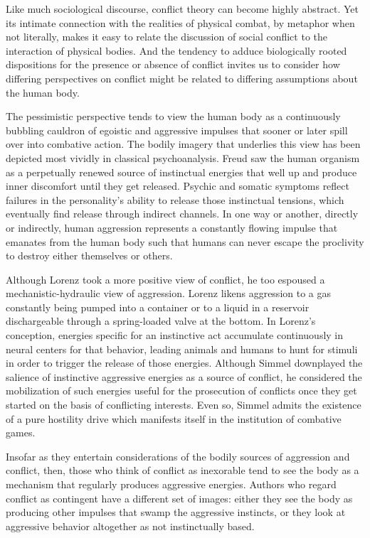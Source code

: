 Like much sociological discourse, conflict theory can become highly abstract. Yet its intimate connection with the realities of physical combat, by metaphor when not literally, makes it easy to relate the discussion of social conflict to the interaction of physical bodies. And the tendency to adduce biologically rooted dispositions for the presence or absence of conflict invites us to consider how differing perspectives on conflict might be related to differing assumptions about the human body.

The pessimistic perspective tends to view the human body as a continuously bubbling cauldron of egoistic and aggressive impulses that sooner or later spill over into combative action. The bodily imagery that underlies this view has been depicted most vividly in classical psychoanalysis. Freud saw the human organism as a perpetually renewed source of instinctual energies that well up and produce inner discomfort until they get released. Psychic and somatic symptoms reflect failures in the personality's ability to release those instinctual tensions, which eventually find release through indirect channels. In one way or another, directly or indirectly, human aggression represents a constantly flowing impulse that emanates from the human body such that humans can never escape the proclivity to destroy either themselves or others. 

Although Lorenz took a more positive view of conflict, he too espoused a mechanistic-hydraulic view of aggression. Lorenz likens aggression to a gas constantly being pumped into a container or to a liquid in a reservoir dischargeable through a spring-loaded valve at the bottom. In Lorenz's conception, energies specific for an instinctive act accumulate continuously in neural centers for that behavior, leading animals and humans to hunt for stimuli in order to trigger the release of those energies. Although Simmel downplayed the salience of instinctive aggressive energies as a source of conflict, he considered the mobilization of such energies useful for the prosecution of conflicts once they get started on the basis of conflicting interests. Even so, Simmel admits the existence of a pure hostility drive which manifests itself in the institution of combative games.

Insofar as they entertain considerations of the bodily sources of aggression and conflict, then, those who think of conflict as inexorable tend to see the body as a mechanism that regularly produces aggressive energies. Authors who regard conflict as contingent have a different set of images: either they see the body as producing other impulses that swamp the aggressive instincts, or they look at aggressive behavior altogether as not instinctually based.

